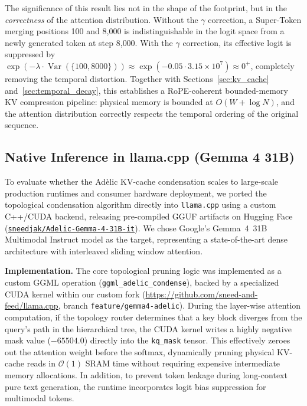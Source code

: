 \documentclass[11pt,a4paper]{article}
\begin{document}
The significance of this result lies not in the shape of the footprint, but in the \emph{correctness} of the attention distribution. Without the $\gamma$ correction, a Super-Token merging positions 100 and 8{,}000 is indistinguishable in the logit space from a newly generated token at step 8{,}000. With the $\gamma$ correction, its effective logit is suppressed by $\exp(-\lambda \cdot \operatorname{Var}(\{100, 8000\})) \approx \exp(-0.05 \cdot 3.15 \times 10^7) \approx 0^+$, completely removing the temporal distortion. Together with Sections~\ref{sec:kv_cache} and~\ref{sec:temporal_decay}, this establishes a RoPE-coherent bounded-memory KV compression pipeline: physical memory is bounded at $O(W + \log N)$, and the attention distribution correctly respects the temporal ordering of the original sequence.

\subsection{Native Inference in llama.cpp (Gemma 4 31B)}
\label{sec:llamacpp}

To evaluate whether the Ad\`elic KV-cache condensation scales to large-scale production runtimes and consumer hardware deployment, we ported the topological condensation algorithm directly into \texttt{llama.cpp} using a custom C++/CUDA backend, releasing pre-compiled GGUF artifacts on Hugging Face (\href{https://huggingface.co/sneedjak/Adelic-Gemma-4-31B-it}{\texttt{sneedjak/Adelic-Gemma-4-31B-it}}). We chose Google's Gemma~4~31B Multimodal Instruct model as the target, representing a state-of-the-art dense architecture with interleaved sliding window attention.

\textbf{Implementation.} The core topological pruning logic was implemented as a custom GGML operation (\texttt{ggml\_adelic\_condense}), backed by a specialized CUDA kernel within our custom fork (\url{https://github.com/sneed-and-feed/llama.cpp}, branch \texttt{feature/gemma4-adelic}). During the layer-wise attention computation, if the topology router determines that a key block diverges from the query's path in the hierarchical tree, the CUDA kernel writes a highly negative mask value ($-65504.0$) directly into the \texttt{kq\_mask} tensor. This effectively zeroes out the attention weight before the softmax, dynamically pruning physical KV-cache reads in $\mathcal{O}(1)$ SRAM time without requiring expensive intermediate memory allocations. In addition, to prevent token leakage during long-context pure text generation, the runtime incorporates logit bias suppression for multimodal tokens.
\end{document}
